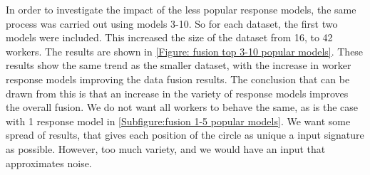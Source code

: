 In order to investigate the impact of the less popular response models, the same process was carried out using models 3-10. So for each dataset, the first two models were included. 
This increased the size of the dataset from 16, to 42 workers. The results are shown in \ref{Figure: fusion top 3-10 popular models}. 
These results show the same trend as the smaller dataset, with the increase in worker response models improving the data fusion results. 
The conclusion that can be drawn from this is that an increase in the variety of response models improves the overall fusion. 
We do not want all workers to behave the same, as is the case with 1 response model in \ref{Subfigure:fusion 1-5 popular models}. 
We want some spread of results, that gives each position of the circle as unique a input signature as possible. 
However, too much variety, and we would have an input that approximates noise.

















